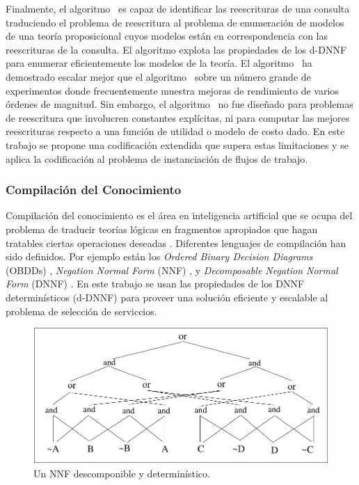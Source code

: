Finalmente, el algoritmo \mcdsat\ es capaz de identificar las reescrituras de una
consulta traduciendo el problema de reescritura al problema de enumeración de
modelos de una teoría proposicional cuyos modelos están en correspondencia con
las reescrituras de la consulta. El algoritmo explota las propiedades de los
d-DNNF para enumerar eficientemente los modelos de la teoría.
El algoritmo
\mcdsat\ ha demostrado escalar mejor que el algoritmo \minicon\ sobre un número
grande de experimentos donde frecuentemente muestra mejoras de rendimiento de
varios órdenes de magnitud. Sin embargo, el algoritmo \mcdsat\ no fue diseñado
para problemas de reescritura que involucren constantes explícitas, ni para
computar las mejores reescrituras respecto a una función de utilidad o modelo de
costo dado. En este trabajo se propone una codificación extendida que supera
estas limitaciones y se aplica la codificación al problema de instanciación de
flujos de trabajo.

\subsubsection{Compilación del Conocimiento}

Compilación del conocimiento es el área en inteligencia artificial que se ocupa
del problema de traducir teorías lógicas en fragmentos apropiados que hagan
tratables ciertas operaciones deseadas \cite{cadoli:compilation}. Diferentes lenguajes de
compilación han sido definidos. Por ejemplo están los \emph{Ordered
Binary Decision Diagrams} (OBDDs) \cite{bryant:obdd},
\emph{Negation Normal Form} (NNF) \cite{barwise:handbook}, y
\emph{Decomposable Negation Normal Form} (DNNF) \cite{darwiche:map}. En este trabajo se usan las
propiedades de los DNNF determinísticos (d-DNNF) \cite{darwiche:d-dnnfs} para proveer una
solución eficiente y escalable al problema de selección de serviccios.

\begin{figure}[t]
\centering
\includegraphics[width=.7\textwidth]{graphics/odd}
\caption{Un NNF descomponible y determinístico.}
\label{fig:dnnf}
\end{figure}

